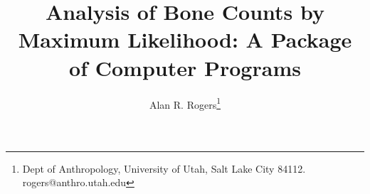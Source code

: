 \documentclass{report}
\begin{document}
\author{Alan R. Rogers\thanks{Dept of Anthropology, University of Utah,
Salt Lake City 84112. rogers@anthro.utah.edu}}
\title{Analysis of Bone Counts by Maximum Likelihood: A Package of
Computer Programs}
\maketitle
\tableofcontents









\end{document}
